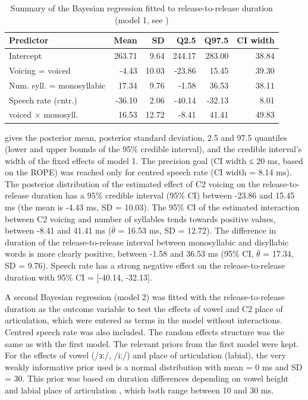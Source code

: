\documentclass[
  12pt,
  a4paper,
]{article}
\begin{document}
\begin{table}[t]

\caption{\label{tab:rr-1-table}Summary of the Bayesian regression fitted to release-to-release duration (model 1, see )}
\centering
\fontsize{8}{10}\selectfont
\begin{tabular}{lrrrrr}
\toprule
Predictor & Mean & SD & Q2.5 & Q97.5 & CI width\\
\midrule
Intercept & 263.71 & 9.64 & 244.17 & 283.00 & 38.84\\
Voicing = voiced & -4.43 & 10.03 & -23.86 & 15.45 & 39.30\\
Num. syll. = monosyllabic & 17.34 & 9.76 & -1.58 & 36.53 & 38.11\\
Speech rate (cntr.) & -36.10 & 2.06 & -40.14 & -32.13 & 8.01\\
voiced × monosyll. & 16.53 & 12.72 & -8.41 & 41.41 & 49.83\\
\bottomrule
\end{tabular}
\end{table}

 gives the posterior mean, posterior standard
deviation, 2.5 and 97.5 quantiles (lower and upper bounds of the 95\%
credible interval), and the credible interval's width of the fixed
effects of model 1. The precision goal (CI width ≤ 20 ms, based on the
ROPE) was reached only for centred speech rate (CI width = 8.14 ms). The
posterior distribution of the estimated effect of C2 voicing on the
release-to-release duration has a 95\% credible interval (95\% CI)
between -23.86 and 15.45 ms (the mean is -4.43 ms, SD = 10.03). The 95\%
CI of the estimated interaction between C2 voicing and number of
syllables tends towards positive values, between -8.41 and 41.41 ms
(\(\bar{\theta}\) = 16.53 ms, SD = 12.72). The difference in duration of
the release-to-release interval between monosyllabic and disyllabic
words is more clearly positive, between -1.58 and 36.53 ms (95\% CI,
\(\bar{\theta}\) = 17.34, SD = 9.76). Speech rate has a strong negative
effect on the release-to-release duration with 95\% CI = {[}-40.14,
-32.13{]}.

A second Bayesian regression (model 2) was fitted with the
release-to-release duration as the outcome variable to test the effects
of vowel and C2 place of articulation, which were entered as terms in
the model without interactions. Centred speech rate was also included.
The random effects structure was the same as with the first model. The
relevant priors from the first model were kept. For the effects of vowel
(/ɜː/, /iː/) and place of articulation (labial), the very weakly
informative prior used is a normal distribution with mean = 0 ms and SD
= 30. This prior was based on duration differences depending on vowel
height \citep{heffner1937, house1953, hertrich1997} and labial place of
articulation \citep{sharf1962}, which both range between 10 and 30 ms.
\end{document}
